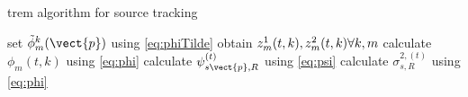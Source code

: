 \begin{algorithm}
\caption{\acrshort{trem} algorithm for source tracking}
\label{alg:trem}
\begin{algorithmic}
\State set $\tilde\phi^k_m(\vect{p})$ using \ref{eq:phiTilde}
\State obtain $z_m^1(t,k), z_m^2(t,k)\space\forall k,m$
\State calculate $\phi_m(t,k)$ using \ref{eq:phi}
\State calculate $\psi^{(t)}_{s\vect{p},R}$ using \ref{eq:psi}
\State calculate $\sigma^{2,(t)}_{s,R}$ using \ref{eq:phi}
\EndFor
\end{algorithmic}
\end{algorithm}
